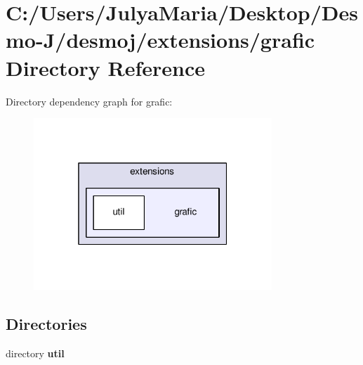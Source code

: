 \section{C\-:/\-Users/\-Julya\-Maria/\-Desktop/\-Desmo-\/\-J/desmoj/extensions/grafic Directory Reference}
\label{dir_52fe577e1c3c971f02dbd425850929e6}
Directory dependency graph for grafic\-:
\nopagebreak
\begin{figure}[H]
\begin{center}
\leavevmode
\includegraphics[width=254pt]{dir_52fe577e1c3c971f02dbd425850929e6_dep}
\end{center}
\end{figure}
\subsection*{Directories}
\begin{DoxyCompactItemize}
\item 
directory {\bf util}
\end{DoxyCompactItemize}

